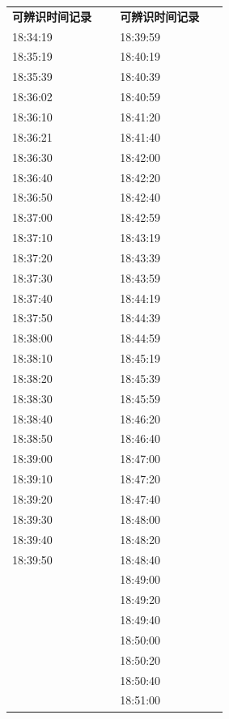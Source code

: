 \documentclass[UTF8,10pt,a4paper,fontset=fandol]{ctexart}
\begin{document}
\newpage

\begin{center}
\small
\begin{tabular}{p{0.42\linewidth}p{0.42\linewidth}}
\textbf{可辨识时间记录} & \textbf{可辨识时间记录} \\[2pt]
18:34:19 & 18:39:59 \\
18:35:19 & 18:40:19 \\
18:35:39 & 18:40:39 \\
18:36:02 & 18:40:59 \\
18:36:10 & 18:41:20 \\
18:36:21 & 18:41:40 \\
18:36:30 & 18:42:00 \\
18:36:40 & 18:42:20 \\
18:36:50 & 18:42:40 \\
18:37:00 & 18:42:59 \\
18:37:10 & 18:43:19 \\
18:37:20 & 18:43:39 \\
18:37:30 & 18:43:59 \\
18:37:40 & 18:44:19 \\
18:37:50 & 18:44:39 \\
18:38:00 & 18:44:59 \\
18:38:10 & 18:45:19 \\
18:38:20 & 18:45:39 \\
18:38:30 & 18:45:59 \\
18:38:40 & 18:46:20 \\
18:38:50 & 18:46:40 \\
18:39:00 & 18:47:00 \\
18:39:10 & 18:47:20 \\
18:39:20 & 18:47:40 \\
18:39:30 & 18:48:00 \\
18:39:40 & 18:48:20 \\
18:39:50 & 18:48:40 \\
 & 18:49:00 \\
 & 18:49:20 \\
 & 18:49:40 \\
 & 18:50:00 \\
 & 18:50:20 \\
 & 18:50:40 \\
 & 18:51:00 \\

\end{tabular}
\end{center}
\end{document}

